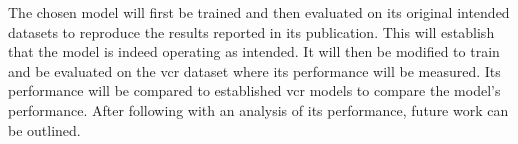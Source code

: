 The chosen model will first be trained and then evaluated on its original intended datasets to reproduce the results reported in its publication.
This will establish that the model is indeed operating as intended.
It will then be modified to train and be evaluated on the \gls{vcr} dataset where its performance will be measured.
Its performance will be compared to established \gls{vcr} models to compare the model's performance.
After following with an analysis of its performance, future work can be outlined.
